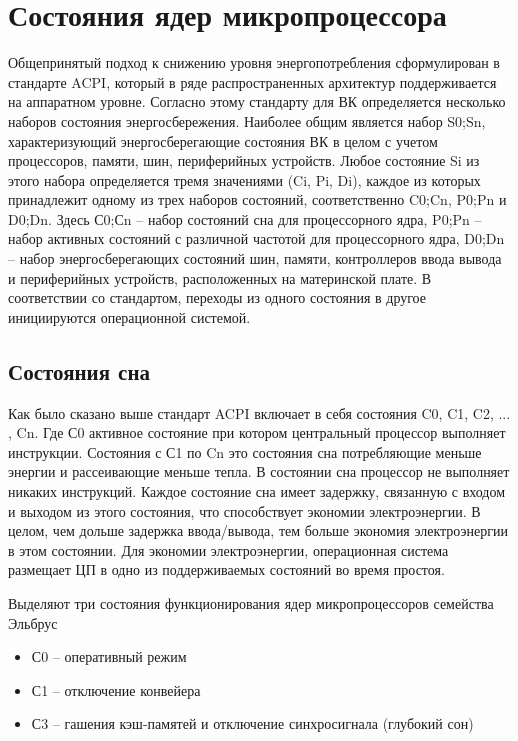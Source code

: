 \documentclass{article}
\begin{document}
\newpage
\section{Состояния ядер микропроцессора}

Общепринятый подход к снижению уровня энергопотребления сформулирован в стандарте ACPI, который в ряде распространенных архитектур поддерживается на аппаратном уровне. Согласно этому стандарту для ВК определяется несколько наборов состояния энергосбережения. Наиболее общим является набор {S0;Sn}, характеризующий энергосберегающие состояния ВК в целом с учетом процессоров, памяти, шин, периферийных устройств. Любое состояние Si из этого набора определяется тремя значениями (Ci, Pi, Di), каждое из которых принадлежит одному из трех наборов состояний, соответственно {C0;Cn}, {P0;Pn} и {D0;Dn}. Здесь {С0;Сn} – набор состояний сна для процессорного ядра, {P0;Pn} – набор активных состояний с различной частотой для процессорного ядра, {D0;Dn} – набор энергосберегающих состояний шин, памяти, контроллеров ввода вывода и периферийных устройств, расположенных на материнской плате. В соответствии со стандартом, переходы из одного состояния в другое инициируются операционной системой.

\subsection{Состояния сна}

Как было сказано выше стандарт ACPI включает в себя состояния C0, C1, C2, ... , Cn. Где С0 активное состояние при котором центральный процессор выполняет инструкции. Состояния с С1 по Cn это состояния сна потребляющие меньше энергии и рассеивающие меньше тепла. В состоянии сна процессор не выполняет никаких инструкций. Каждое состояние сна имеет задержку, связанную с входом и выходом из этого состояния, что способствует экономии электроэнергии. В целом, чем дольше задержка ввода/вывода, тем больше экономия электроэнергии в этом состоянии. Для экономии электроэнергии, операционная система размещает ЦП в одно из поддерживаемых состояний во время простоя.

Выделяют три состояния функционирования ядер микропроцессоров семейства Эльбрус
\begin{itemize}
\item С0 – оперативный режим
\item С1 – отключение конвейера
\item С3 – гашения кэш-памятей и отключение синхросигнала (глубокий сон)
\end{itemize}
\end{document}
